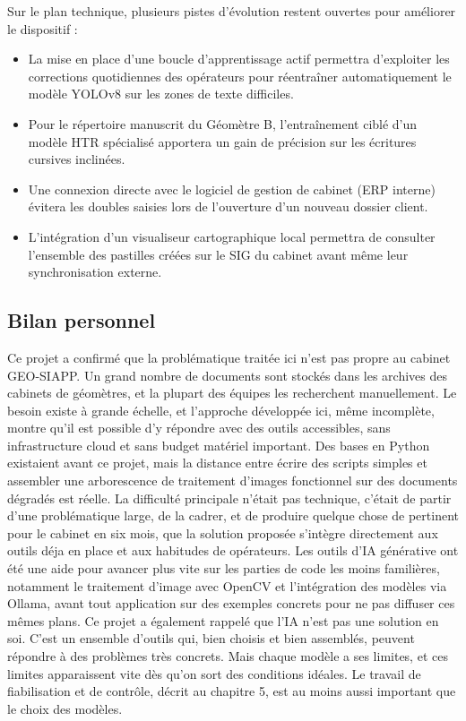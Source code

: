 Sur le plan technique, plusieurs pistes d'évolution restent ouvertes pour améliorer le dispositif :
\begin{itemize}
  \item La mise en place d'une boucle d'apprentissage actif permettra d'exploiter les corrections quotidiennes des opérateurs pour réentraîner automatiquement le modèle YOLOv8 sur les zones de texte difficiles.
  \item Pour le répertoire manuscrit du Géomètre B, l'entraînement ciblé d'un modèle HTR spécialisé apportera un gain de précision sur les écritures cursives inclinées.
  \item Une connexion directe avec le logiciel de gestion de cabinet (ERP interne) évitera les doubles saisies lors de l'ouverture d'un nouveau dossier client.
  \item L'intégration d'un visualiseur cartographique local permettra de consulter l'ensemble des pastilles créées sur le SIG du cabinet avant même leur synchronisation externe.
\end{itemize}


\subsection{Bilan personnel}

Ce projet a confirmé que la problématique traitée ici n’est pas propre au cabinet GEO-SIAPP. Un
grand nombre de documents sont stockés dans les archives des cabinets de géomètres, et la plupart des
équipes les recherchent manuellement. Le besoin existe à grande échelle, et l’approche développée ici,
même incomplète, montre qu’il est possible d’y répondre avec des outils accessibles, sans infrastructure
cloud et sans budget matériel important.
Des bases en Python existaient avant ce projet, mais la distance entre écrire des scripts simples et
assembler une arborescence de traitement d’images fonctionnel sur des documents dégradés est réelle.
La difficulté principale n’était pas technique, c’était de partir d’une problématique large, de la cadrer,
et de produire quelque chose de pertinent pour le cabinet en six mois, que la solution proposée s'intègre directement aux outils déja en place et aux habitudes de opérateurs. Les outils d’IA générative ont été une aide
pour avancer plus vite sur les parties de code les moins familières, notamment le traitement d’image avec
OpenCV et l’intégration des modèles via Ollama, avant tout application sur des exemples concrets pour
ne pas diffuser ces mêmes plans.
Ce projet a également rappelé que l’IA n’est pas une solution en soi. C’est un ensemble d’outils qui,
bien choisis et bien assemblés, peuvent répondre à des problèmes très concrets. Mais chaque modèle a
ses limites, et ces limites apparaissent vite dès qu’on sort des conditions idéales. Le travail de fiabilisation
et de contrôle, décrit au chapitre 5, est au moins aussi important que le choix des modèles.


